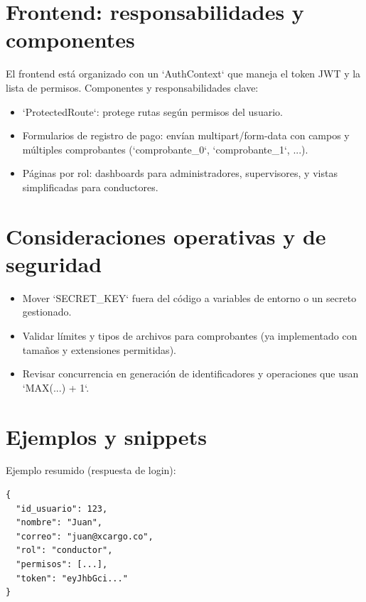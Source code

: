 \section{Frontend: responsabilidades y componentes}
El frontend está organizado con un `AuthContext` que maneja el token JWT y la lista de permisos. Componentes y responsabilidades clave:
\begin{itemize}
\item `ProtectedRoute`: protege rutas según permisos del usuario.
\item Formularios de registro de pago: envían multipart/form-data con campos y múltiples comprobantes (`comprobante_0`, `comprobante_1`, ...).
\item Páginas por rol: dashboards para administradores, supervisores, y vistas simplificadas para conductores.
\end{itemize}

\section{Consideraciones operativas y de seguridad}
\begin{itemize}
\item Mover `SECRET_KEY` fuera del código a variables de entorno o un secreto gestionado.
\item Validar límites y tipos de archivos para comprobantes (ya implementado con tamaños y extensiones permitidas).
\item Revisar concurrencia en generación de identificadores y operaciones que usan `MAX(...) + 1`.
\end{itemize}

\section{Ejemplos y snippets}
Ejemplo resumido (respuesta de login):
\begin{verbatim}
{
  "id_usuario": 123,
  "nombre": "Juan",
  "correo": "juan@xcargo.co",
  "rol": "conductor",
  "permisos": [...],
  "token": "eyJhbGci..."
}
\end{verbatim}


